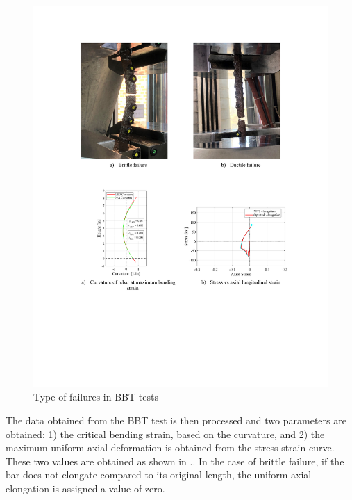 \begin{figure}[htbp]
	\centering
    \includegraphics[width=1\textwidth]{VAC Thesis 2.0/Chapter-4/figs/BBT_Brittle_vs_Ductile_fracture.pdf}
	\caption{Type of failures in BBT tests}
	\label{fig:bbt_brittle_vs_duc}
\end{figure}

The data obtained from the BBT test is then processed and two parameters are obtained: 1) the critical bending strain, based on the curvature, and 2) the maximum uniform axial deformation is obtained from the stress strain curve. These two values are obtained as shown in .. In the case of brittle failure, if the bar does not elongate compared to its original length, the uniform axial elongation is assigned a value of zero.

